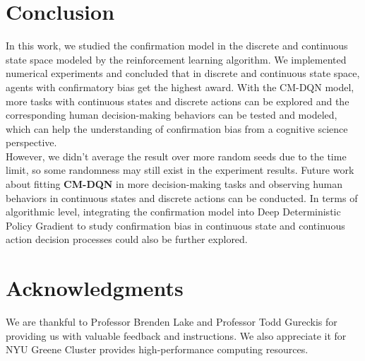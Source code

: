 \documentclass[10pt,letterpaper]{article}
\begin{document}
\section{Conclusion}
In this work, we studied the confirmation model in the discrete and continuous state space modeled by the reinforcement learning algorithm. We implemented numerical experiments and concluded that in discrete and continuous state space, agents with confirmatory bias get the highest award. With the CM-DQN model, more tasks with continuous states and discrete actions can be explored and the corresponding human decision-making behaviors can be tested and modeled, which can help the understanding of confirmation bias from a cognitive science perspective.\\
However, we didn't average the result over more random seeds due to the time limit, so some randomness may still exist in the experiment results.
Future work about fitting \textbf{CM-DQN} in more decision-making tasks and observing human behaviors in continuous states and discrete actions can be conducted. In terms of algorithmic level, integrating the confirmation model into Deep Deterministic Policy Gradient to study confirmation bias in continuous state and continuous action decision processes could also be further explored.
\section{Acknowledgments}
We are thankful to Professor Brenden Lake and Professor Todd Gureckis for providing us with valuable feedback and instructions. We also appreciate it for NYU Greene Cluster provides high-performance computing resources.

\nocite{ChalnickBillman1988a}
\nocite{Feigenbaum1963a}
\nocite{Hill1983a}
\nocite{OhlssonLangley1985a}
\nocite{Matlock2001}
\nocite{NewellSimon1972a}
\nocite{ShragerLangley1990a}




\setlength{\bibleftmargin}{.125in}
\setlength{\bibindent}{-\bibleftmargin}


\end{document}
